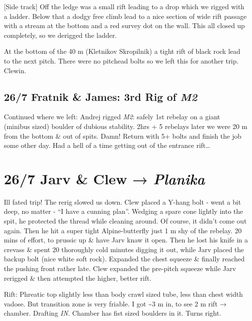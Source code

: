 {[}Side track{]} Off the ledge was a small rift leading to a drop which
we rigged with a ladder. Below that a dodgy free climb lead to a nice
section of wide rift passage with a stream at the bottom and a red
survey dot on the wall. This all closed up completely, so we derigged
the ladder.

At the bottom of the 40 m (Kletnikov Skropilnik) a tight rift of black
rock lead to the next pitch. There were no pitchead bolts so we left
this for another trip. Clewin.

\hypertarget{fratnik-james-3rd-rig-of-m2}{%
\subsection{\texorpdfstring{26/7 Fratnik \& James: 3rd Rig of
\emph{M2}}{26/7 Fratnik \& James: 3rd Rig of M2}}\label{fratnik-james-3rd-rig-of-m2}}

Continued where we left: Andrej rigged \emph{M2}: safely 1st rebelay on
a giant (minibus sized) boulder of dubious stability. 2hrs + 5 rebelays
later we were 20 m from the bottom \& out of spits. Damn! Return with 5+
bolts and finish the job some other day. Had a hell of a time getting
out of the entrance rift\ldots{}

\hypertarget{jarv-clew-planika}{%
\section{\texorpdfstring{26/7 Jarv \& Clew →
\emph{Planika}}{26/7 Jarv \& Clew → Planika}}\label{jarv-clew-planika}}

Ill fated trip! The rerig slowed us down. Clew placed a Y-hang bolt -
went a bit deep, no matter - ``I have a cunning plan''. Wedging a spare
cone lightly into the spit, he protected the thread while cleaning
around. Of course, it didn't come out again. Then he hit a super tight
Alpine-butterfly just 1 m shy of the rebelay. 20 mins of effort, to
prussic up \& have Jarv knaw it open. Then he lost his knife in a
crevass \& spent 20 thoroughly cold minutes digging it out, while Jarv
placed the backup bolt (nice white soft rock). Expanded the chest
squeeze \& finally reached the pushing front rather late. Clew expanded
the pre-pitch squeeze while Jarv rerigged \& then attempted the higher,
better rift.

Rift: Phreatic top slightly less than body crawl sized tube, less than
chest width vadose. But transition zone is very friable. I got
\textasciitilde{}3 m in, to see 2 m rift → chamber. Drafting \emph{IN}.
Chamber has fist sized boulders in it. Turns right.

